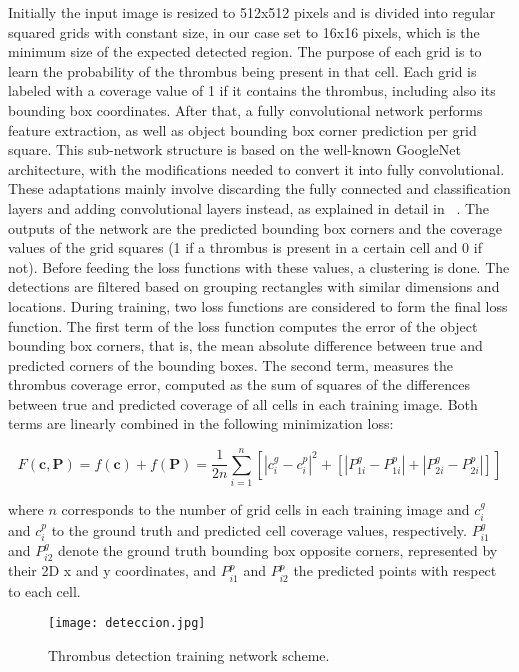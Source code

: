 \documentclass[preprint,authoryear,12pt]{elsarticle}
\begin{document}
Initially the input image is resized to 512x512 pixels and is divided into regular squared grids with constant size, in our case set to 16x16 pixels, which is the minimum size of the expected detected region. 
The purpose of each grid is to learn the probability of the thrombus being present in that cell. Each grid is labeled with a coverage value of 1 if it contains the thrombus, including also its bounding box coordinates. After that, a fully convolutional network performs feature extraction, as well as object bounding box corner prediction per grid square. This sub-network structure is based on the well-known GoogleNet ~\citep{Googlenet} architecture, with the modifications needed to convert it into fully convolutional. These adaptations mainly involve discarding the fully connected and classification layers and adding convolutional layers instead, as explained in detail in ~\citep{Lon15}. The outputs of the network are the predicted bounding box corners and the coverage values of the grid squares (1 if a thrombus is present in a certain cell and 0 if not). Before feeding the loss functions with these values, a clustering is done. The detections are filtered based on grouping rectangles with similar dimensions and locations. During training, two loss functions are considered to form the final loss function. The first term of the loss function computes the error of the object bounding box corners, that is, the mean absolute difference between true and predicted corners of the bounding boxes. The second term, measures the thrombus coverage error, computed as the sum of squares of the differences between true and predicted coverage of all cells in each training image. Both terms are linearly combined in the following minimization loss:

\[F(\textbf{c},\textbf{P})=f(\textbf{c})+f(\textbf{P})=\frac{1}{2n}\sum_{i=1}^{n}[|c_i^g-c_i^p|^2+[|P_{1i}^g-P_{1i}^p|+|P_{2i}^g-P_{2i}^p|]] \]

where \(n\) corresponds to the number of grid cells in each training image and \(c_i^g\) and \(c_i^p \) to the ground truth and predicted cell coverage values, respectively. \(P_{i1}^g\) and \(P_{i2}^g\) denote the ground truth bounding box opposite corners, represented by their 2D x and y coordinates, and \(P_{i1}^p\) and \(P_{i2}^p\) the predicted points with respect to each cell.


\begin{figure}
\centering
\texttt{[image: deteccion.jpg]}
\caption{\label{fig:detection}Thrombus detection training network scheme.}
\end{figure}
\end{document}
